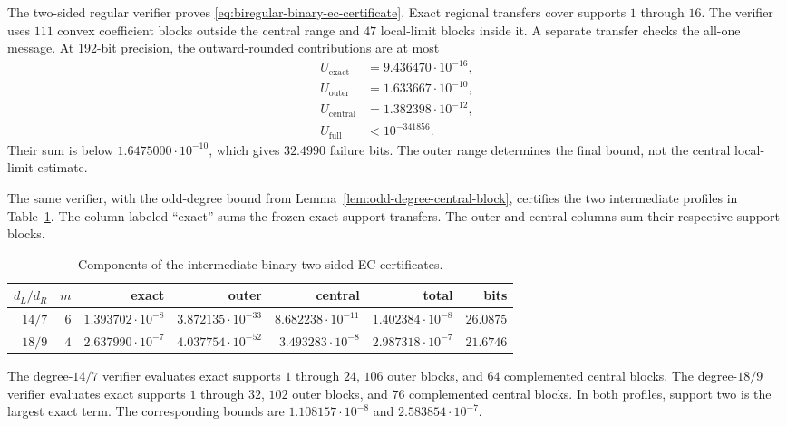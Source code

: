 The two-sided regular verifier proves
\eqref{eq:biregular-binary-ec-certificate}.  Exact regional transfers cover
supports $1$ through $16$.  The verifier uses $111$ convex coefficient
blocks outside the central range and $47$ local-limit blocks inside it.  A
separate transfer checks the all-one message.  At 192-bit precision, the
outward-rounded contributions are at most
\begin{align*}
 U_{\mathrm{exact}}&=9.436470\cdot10^{-16},\\
 U_{\mathrm{outer}}&=1.633667\cdot10^{-10},\\
 U_{\mathrm{central}}&=1.382398\cdot10^{-12},\\
 U_{\mathrm{full}}&<10^{-341856}.
\end{align*}
Their sum is below $1.6475000\cdot10^{-10}$, which gives $32.4990$ failure
bits.  The outer range determines the final bound, not the central
local-limit estimate.

The same verifier, with the odd-degree bound from
Lemma~\ref{lem:odd-degree-central-block}, certifies the two intermediate
profiles in Table~\ref{tab:binary-biregular-intermediate-certificates}.
The column labeled ``exact'' sums the frozen exact-support transfers.  The
outer and central columns sum their respective support blocks.

\begin{table}[t]
\centering
\caption{Components of the intermediate binary two-sided EC certificates.}
\label{tab:binary-biregular-intermediate-certificates}
\begin{tabular}{@{}rrrrrrr@{}}
\toprule
$d_L/d_R$ & $m$ & exact & outer & central & total & bits \\
\midrule
$14/7$ & $6$ & $1.393702\cdot10^{-8}$ & $3.872135\cdot10^{-33}$
 & $8.682238\cdot10^{-11}$ & $1.402384\cdot10^{-8}$ & $26.0875$ \\
$18/9$ & $4$ & $2.637990\cdot10^{-7}$ & $4.037754\cdot10^{-52}$
 & $3.493283\cdot10^{-8}$ & $2.987318\cdot10^{-7}$ & $21.6746$ \\
\bottomrule
\end{tabular}
\end{table}

The degree-$14/7$ verifier evaluates exact supports $1$ through $24$, $106$
outer blocks, and $64$ complemented central blocks.  The degree-$18/9$
verifier evaluates exact supports $1$ through $32$, $102$ outer blocks, and
$76$ complemented central blocks.  In both profiles, support two is the
largest exact term.  The corresponding bounds are $1.108157\cdot10^{-8}$
and $2.583854\cdot10^{-7}$.

